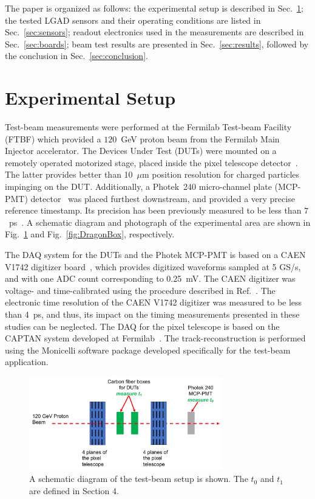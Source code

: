 \documentclass[preprint,1p]{elsarticle}
\begin{document}
The paper is organized as follows: the experimental setup is described in
Sec.~\ref{sec:setup}; the tested LGAD sensors and their operating conditions are
listed in Sec.~\ref{sec:sensors}; readout electronics used in the measurements are 
described in Sec.~\ref{sec:boards}; beam test results are presented in 
Sec.~\ref{sec:results}, followed by the conclusion in Sec.~\ref{sec:conclusion}.

\section{Experimental Setup} 
\label{sec:setup}


Test-beam measurements were performed at the Fermilab Test-beam Facility (FTBF)
which provided a $120$~GeV proton beam from the Fermilab Main Injector
accelerator. The Devices Under Test (DUTs) were mounted on a remotely operated
motorized stage, placed inside the pixel telescope detector~\cite{KWAN2016162}.
The latter provides better than 10~$\mu$m position resolution for charged
particles impinging on the DUT. Additionally, a Photek~240 micro-channel plate
(MCP-PMT) detector~\cite{Anderson:2015gha, MCPFastCaloNIMA,
Ronzhin2015288,Ronzhin201552} was placed furthest downstream, and provided a
very precise reference timestamp. Its precision has been previously
measured to be less than $7$~ps~\cite{Ronzhin2015288}. A schematic diagram and
photograph of the experimental area are shown in Fig.~\ref{fig:DragonBoxDiagram}
and Fig.~\ref{fig:DragonBox}, respectively. 

The DAQ system for the DUTs and the Photek MCP-PMT is based on a CAEN V1742
digitizer board~\cite{CAENDRS}, which provides digitized waveforms sampled at 5
GS/s, and with one ADC count corresponding to 0.25~mV. The CAEN digitizer was
voltage- and time-calibrated using the procedure described in
Ref.~\cite{Kim201467}. The electronic time resolution of the CAEN V1742
digitizer was measured to be less than 4~ps, and thus, its impact on the timing
measurements presented in these studies can be neglected. The DAQ for the pixel
telescope is based on the CAPTAN system developed at
Fermilab~\cite{KWAN2016162}. The track-reconstruction is performed using the
Monicelli software package developed specifically for the test-beam application. 

\begin{figure}[htbp] 
\centering
\includegraphics[width=0.75\textwidth]{figs/BeamSetup.pdf} 
\caption{A schematic diagram of the test-beam setup is shown. The $t_0$ and $t_1$ are defined in Section 4.} 
\label{fig:DragonBoxDiagram} 
\end{figure} 
\end{document}
